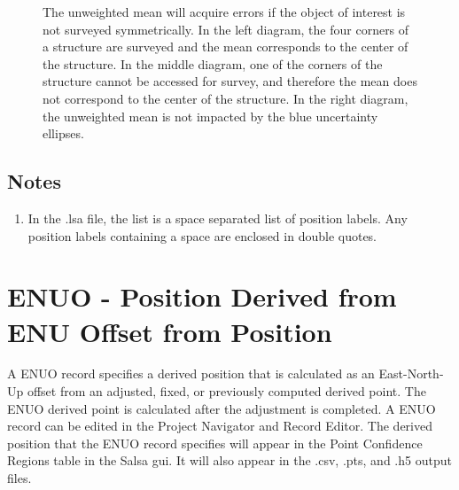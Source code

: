 \begin{figure}[!htbp]
\caption{The unweighted mean will acquire errors if the object of interest is not surveyed symmetrically.  In the left diagram, the four corners of a structure are surveyed and the mean corresponds to the center of the structure.  In the middle diagram, one of the corners of the structure cannot be accessed for survey, and therefore the mean does not correspond to the center of the structure.  In the right diagram, the unweighted mean is not impacted by the blue uncertainty ellipses.}
\label{Fig:mean4Structure}
\end{figure}

\subsection*{Notes}
\begin{enumerate}[label=(\alph*)]
\item In the .lsa file, the list is a space separated list of position labels.  Any position labels containing a space are enclosed in double quotes.
\end{enumerate}


\newpage
\section{ENUO - Position Derived from ENU Offset from Position} \label{sect:ENUO}

A ENUO record specifies a derived position that is calculated as an East-North-Up offset from an adjusted, fixed, or previously computed derived point.  The ENUO derived point is calculated after the adjustment is completed.  A ENUO record can be edited in the Project Navigator and Record Editor.  The derived position that the ENUO record specifies will appear in the Point Confidence Regions table in the Salsa gui.  It will also appear in the .csv, .pts, and .h5 output files.

